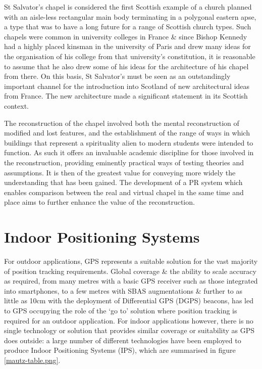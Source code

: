 St Salvator’s chapel is considered the first Scottish example of a church planned with an aisle-less rectangular main body terminating in a polygonal eastern apse, a type that was to have a long future for a range of Scottish church types. Such chapels were common in university colleges in France \& since Bishop Kennedy had a highly placed kinsman in the university of Paris and drew many ideas for the organisation of his college from that university’s constitution, it is reasonable to assume that he also drew some of his ideas for the architecture of his chapel from there. On this basis, St Salvator’s must be seen as an outstandingly important channel for the introduction into Scotland of new architectural ideas from France. The new architecture made a significant statement in its Scottish context. 

The reconstruction of the chapel involved both the mental reconstruction of modified and lost features, and the establishment of the range of ways in which buildings that represent a spirituality alien to modern students were intended to function. As such it offers an invaluable academic discipline for those involved in the reconstruction, providing eminently practical ways of testing theories and assumptions. It is then of the greatest value for conveying more widely the understanding that has been gained. The development of a PR system which enables comparison between the real and virtual chapel in the same time and place aims to further enhance the value of the reconstruction.


\section{Indoor Positioning Systems}

For outdoor applications, GPS represents a suitable solution for the vast majority of position tracking requirements. Global coverage \& the ability to scale accuracy as required, from many metres with a basic GPS receiver such as those integrated into smartphones, to a few metres with SBAS augmentations \& further to as little as 10cm with the deployment of Differential GPS (DGPS) beacons, has led to GPS occupying the role of the `go to' solution where position tracking is required for an outdoor application. For indoor applications however, there is no single technology or solution that provides similar coverage or suitability as GPS does outside: a large number of different technologies have been employed to produce Indoor Positioning Systems (IPS), which are summarised in figure \ref{mautz-table.png}.

